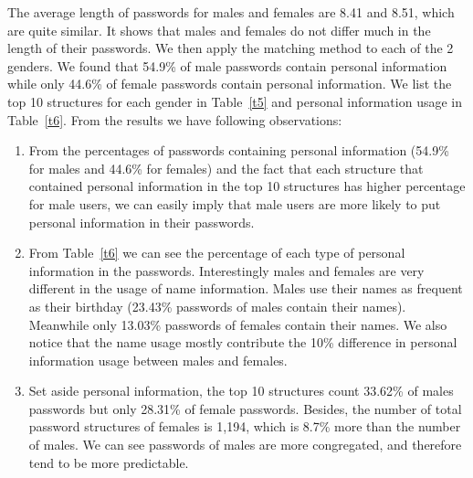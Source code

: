 The average length of passwords for males and females are 8.41 and 8.51, which are quite similar. It shows that males and females do not differ much in the length of their passwords. We then apply the matching method to each of the 2 genders. We found that 54.9\% of male passwords contain personal information while only 44.6\% of female passwords contain personal information. We list the top 10 structures for each gender in Table~\ref{t5} and personal information usage in Table~\ref{t6}. From the results we have following observations:
\begin{enumerate}[leftmargin=*]
\item From the percentages of passwords containing personal information (54.9\% for males and 44.6\% for females) and the fact that each structure that contained personal information in the top 10 structures has higher percentage for male users, we can easily imply that male users are more likely to put personal information in their passwords.
\item From Table~\ref{t6} we can see the percentage of each type of personal information in the passwords. Interestingly males and females are very different in the usage of name information. Males use their names as frequent as their birthday (23.43\% passwords of males contain their names). Meanwhile only 13.03\% passwords of females contain their names. We also notice that the name usage mostly contribute the 10\% difference in personal information usage between males and females. 
\item Set aside personal information, the top 10 structures count 33.62\% of males passwords but only 28.31\% of female passwords. Besides, the number of total password structures of females is 1,194, which is 8.7\% more than the number of males. We can see passwords of males are more congregated, and therefore tend to be more predictable.
\end{enumerate} 

